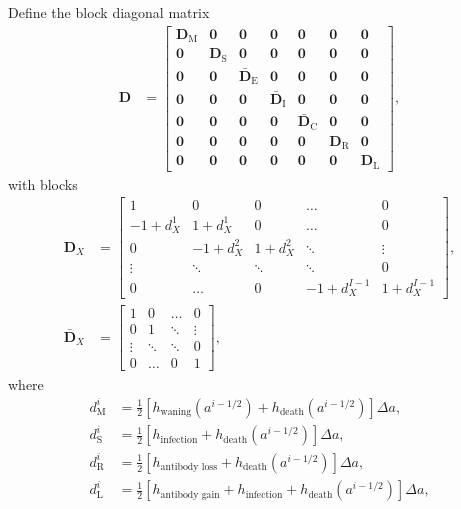 \documentclass[12pt]{article}
\newcommand{\mat}[1]{\mathbf{#1}}
\begin{document}
Define the block diagonal matrix
\begin{align}
  \mat{D} &=
  \begin{bmatrix}
    \mat{D}_{\mathrm{M}} & \mat{0} & \mat{0} &
    \mat{0} & \mat{0} & \mat{0} & \mat{0}
    \\
    \mat{0} & \mat{D}_{\mathrm{S}} & \mat{0} &
    \mat{0} & \mat{0} & \mat{0} & \mat{0}
    \\
    \mat{0} & \mat{0} & \bar{\mat{D}}_{\mathrm{E}} &
    \mat{0} & \mat{0} & \mat{0} & \mat{0}
    \\
    \mat{0} & \mat{0} & \mat{0} &
    \bar{\mat{D}}_{\mathrm{I}} & \mat{0} & \mat{0} & \mat{0}
    \\
    \mat{0} & \mat{0} & \mat{0} & \mat{0} &
    \bar{\mat{D}}_{\mathrm{C}} & \mat{0} & \mat{0}
    \\
    \mat{0} & \mat{0} & \mat{0} & \mat{0} &
    \mat{0} & \mat{D}_{\mathrm{R}} & \mat{0}
    \\
    \mat{0} & \mat{0} & \mat{0} & \mat{0} &
    \mat{0} & \mat{0} & \mat{D}_{\mathrm{L}}
  \end{bmatrix},
\end{align}
with blocks
\begin{subequations}
  \begin{align}
    \mat{D}_X &=
    \begin{bmatrix}
      1 & 0 & 0 & \hdots & 0
      \\
      - 1 + d_X^1 & 1 + d_X^1 & 0 & \hdots & 0
      \\
      0 & - 1 + d_X^2 & 1 + d_X^2 & \ddots & \vdots
      \\
      \vdots & \ddots & \ddots & \ddots & 0
      \\
      0 & \hdots & 0 & - 1 + d_X^{I - 1} & 1 + d_X^{I - 1}
    \end{bmatrix},
    \\
    \bar{\mat{D}}_X &=
    \begin{bmatrix}
      1 & 0 & \hdots & 0 \\
      0 & 1 & \ddots & \vdots \\
      \vdots & \ddots & \ddots & 0 \\
      0 & \hdots & 0 & 1
    \end{bmatrix},
  \end{align}
\end{subequations}
where
\begin{subequations}
  \begin{align}
    d_{\mathrm{M}}^i
    &= \frac{1}{2} \left[h_{\text{waning}}(a^{i - 1 / 2})
      + h_{\text{death}}(a^{i - 1 / 2})\right]
      \Delta a,
    \\
    d_{\mathrm{S}}^i
    &= \frac{1}{2} \left[h_{\text{infection}}
      + h_{\text{death}}(a^{i - 1 / 2})\right]
      \Delta a,
    \\
    d_{\mathrm{R}}^i
    &= \frac{1}{2} \left[h_{\text{antibody loss}}
      + h_{\text{death}}(a^{i - 1 / 2})\right]
      \Delta a,
    \\
    d_{\mathrm{L}}^i
    &= \frac{1}{2} \left[h_{\text{antibody gain}}
      + h_{\text{infection}}
      + h_{\text{death}}(a^{i - 1 / 2})\right]
      \Delta a,
  \end{align}
\end{subequations}
\end{document}
